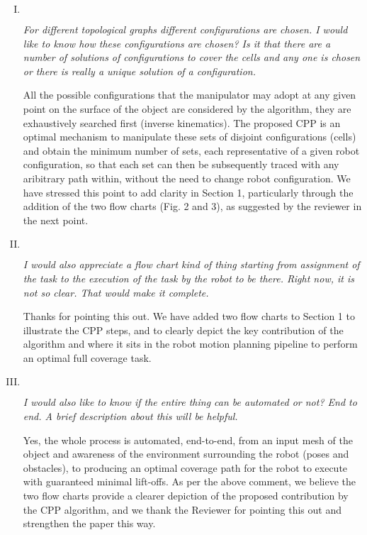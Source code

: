 \documentclass[11pt]{article}
\newenvironment{reviewer}
{\begin{mdframed}[roundcorner = 10pt,fontcolor=blue!70!black]\itshape}
{\end{mdframed}}
\begin{document}
\begin{enumerate}[I.]
 \item $ $
  \begin{reviewer}
    For different topological graphs different configurations are chosen. I would like to know how these configurations are chosen? Is it that there are a number of solutions of configurations to cover the cells and any one is chosen or there is really a unique solution of a configuration.
    \end{reviewer}
  \noindent All the possible configurations that the manipulator may adopt at any given point on the surface of the object are considered by the algorithm, they are exhaustively searched first (inverse kinematics). The proposed CPP is an optimal mechanism to manipulate these sets of disjoint configurations (cells) 
and obtain the minimum number of sets, each representative of a given robot configuration, so that each set can then be subsequently traced with any aribitrary path within, without the need to change robot configuration. We have stressed this point to add clarity in Section 1, particularly through the addition of 
the two flow charts (Fig. 2 and 3), as suggested by the reviewer in the next point.

  \item $ $
  \begin{reviewer}
    I would also appreciate a flow chart kind of thing starting from assignment of the task to the execution of the task by the robot to be there. Right now, it is not so clear. That would make it complete.
   \end{reviewer}
  \noindent Thanks for pointing this out. We have added two flow charts to Section 1 to illustrate the CPP steps, and to clearly depict the key contribution of the algorithm and where it sits in the robot motion planning pipeline to perform an optimal full coverage task.
  
  \item $ $
  \begin{reviewer}
   I would also like to know if the entire thing can be automated or not? End to end. A brief description about this will be helpful.
   \end{reviewer}
  \noindent Yes, the whole process is automated, end-to-end, from an input mesh of the object and awareness of the environment surrounding the robot (poses and obstacles), to producing an optimal coverage path for the robot to execute with guaranteed minimal lift-offs. As per the above comment, 
we believe the two flow charts provide a clearer depiction of the proposed contribution by the CPP algorithm, and we thank the Reviewer for pointing this out and strengthen the paper this way.
  

\end{enumerate}
\end{document}
